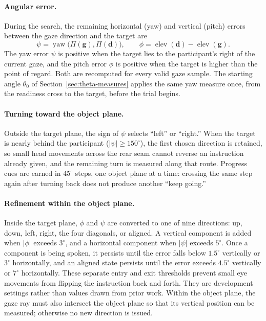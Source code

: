 \paragraph{Angular error.} During the search, the remaining horizontal (yaw) and vertical (pitch) errors between the gaze direction and the target are
\begin{equation}
\psi=\operatorname{yaw}\bigl(\Pi(\mathbf{g}),\Pi(\mathbf{d})\bigr),\qquad
\phi=\operatorname{elev}(\mathbf{d})-\operatorname{elev}(\mathbf{g}).
\end{equation}
The yaw error $\psi$ is positive when the target lies to the participant's right of the current gaze, and the pitch error $\phi$ is positive when the target is higher than the point of regard. Both are recomputed for every valid gaze sample. The starting angle $\theta_0$ of Section~\ref{sec:theta-measures} applies the same yaw measure once, from the readiness cross to the target, before the trial begins.

\paragraph{Turning toward the object plane.} Outside the target plane, the sign of $\psi$ selects ``left'' or ``right.'' When the target is nearly behind the participant ($|\psi|\geq150^\circ$), the first chosen direction is retained, so small head movements across the rear seam cannot reverse an instruction already given, and the remaining turn is measured along that route. Progress cues are earned in $45^\circ$ steps, one object plane at a time: crossing the same step again after turning back does not produce another ``keep going.''

\paragraph{Refinement within the object plane.} Inside the target plane, $\phi$ and $\psi$ are converted to one of nine directions: up, down, left, right, the four diagonals, or aligned. A vertical component is added when $|\phi|$ exceeds $3^\circ$, and a horizontal component when $|\psi|$ exceeds $5^\circ$. Once a component is being spoken, it persists until the error falls below $1.5^\circ$ vertically or $3^\circ$ horizontally, and an aligned state persists until the error exceeds $4.5^\circ$ vertically or $7^\circ$ horizontally. These separate entry and exit thresholds prevent small eye movements from flipping the instruction back and forth. They are development settings rather than values drawn from prior work. Within the object plane, the gaze ray must also intersect the object plane so that its vertical position can be measured; otherwise no new direction is issued.

